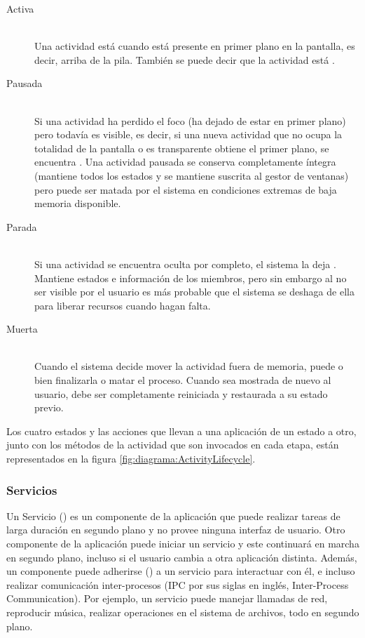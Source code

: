 \begin{description}
    \item[Activa] \hfill \\
     Una actividad está  cuando está presente en primer plano en la pantalla, es decir, arriba de la pila. También se puede decir que la actividad está .

    \item[Pausada] \hfill \\
    Si una actividad ha perdido el foco (ha dejado de estar en primer plano) pero todavía es visible, es decir, si una nueva actividad que no ocupa la totalidad de la pantalla o es transparente obtiene el primer plano, se encuentra . Una actividad pausada se conserva completamente íntegra (mantiene todos los estados y se mantiene suscrita al gestor de ventanas) pero puede ser matada por el sistema en condiciones extremas de baja memoria disponible.

    \item[Parada] \hfill \\
    Si una actividad se encuentra oculta por completo, el sistema la deja . Mantiene estados e información de los miembros, pero sin embargo al no ser visible por el usuario es más probable que el sistema se deshaga de ella para liberar recursos cuando hagan falta.
    
    \item[Muerta] \hfill \\
    Cuando el sistema decide mover la actividad fuera de memoria, puede o bien finalizarla o matar el proceso. Cuando sea mostrada de nuevo al usuario, debe ser completamente reiniciada y restaurada a su estado previo.
\end{description}

    Los cuatro estados y las acciones que llevan a una aplicación de un estado a otro, junto con los métodos de la actividad que son invocados en cada etapa, están representados en la figura \ref{fig:diagrama:ActivityLifecycle}.

\FloatBarrier
\subsubsection{Servicios}
\label{ssec:teo:svc}

Un Servicio () es un componente de la aplicación que puede realizar tareas de larga duración en segundo plano y no provee ninguna interfaz de usuario. Otro componente de la aplicación puede iniciar un servicio y este continuará en marcha en segundo plano, incluso si el usuario cambia a otra aplicación distinta. Además, un componente puede adherirse () a un servicio para interactuar con él, e incluso realizar comunicación inter-procesos (IPC por sus siglas en inglés, Inter-Process Communication). Por ejemplo, un servicio puede manejar llamadas de red, reproducir música, realizar operaciones en el sistema de archivos, todo en segundo plano.

